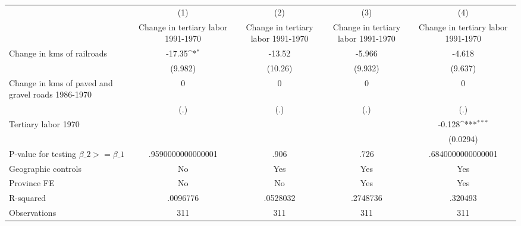 {
\def\sym#1{\ifmmode^{#1}\else\(^{#1}\)\fi}
\begin{tabular}{l*{4}{c}}
\hline\hline
                &\multicolumn{1}{c}{(1)}&\multicolumn{1}{c}{(2)}&\multicolumn{1}{c}{(3)}&\multicolumn{1}{c}{(4)}\\
                &\multicolumn{1}{c}{Change in tertiary labor 1991-1970}&\multicolumn{1}{c}{Change in tertiary labor 1991-1970}&\multicolumn{1}{c}{Change in tertiary labor 1991-1970}&\multicolumn{1}{c}{Change in tertiary labor 1991-1970}\\
\hline
Change in kms of railroads&   -17.35\sym{*}  &   -13.52         &   -5.966         &   -4.618         \\
                &  (9.982)         &  (10.26)         &  (9.932)         &  (9.637)         \\
[1em]
Change in kms of paved and gravel roads 1986-1970&        0         &        0         &        0         &        0         \\
                &      (.)         &      (.)         &      (.)         &      (.)         \\
[1em]
Tertiary labor 1970&                  &                  &                  &   -0.128\sym{***}\\
                &                  &                  &                  & (0.0294)         \\
\hline
P-value for testing $\beta\_{2} >= \beta\_{1}$&.9590000000000001         &     .906         &     .726         &.6840000000000001         \\
Geographic controls&       No         &      Yes         &      Yes         &      Yes         \\
Province FE     &       No         &       No         &      Yes         &      Yes         \\
R-squared       & .0096776         & .0528032         & .2748736         &  .320493         \\
Observations    &      311         &      311         &      311         &      311         \\
\hline\hline
\end{tabular}
}

